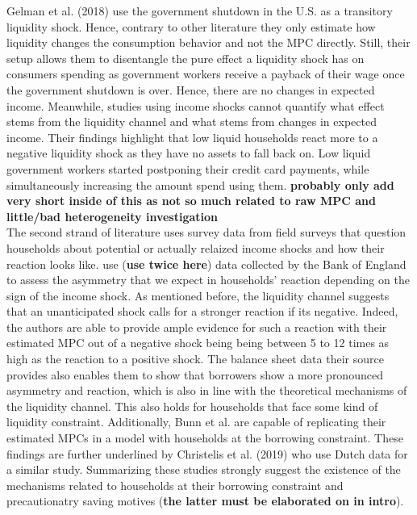 Gelman et al. (2018) use the government shutdown in the U.S. as a transitory liquidity shock. Hence, contrary to other literature they only estimate how liquidity changes the consumption behavior and not the MPC directly. Still, their setup allows them to disentangle the pure effect a liquidity shock has on consumers spending as government workers receive a payback of their wage once the government shutdown is over. Hence, there are no changes in expected income. Meanwhile, studies using income shocks cannot quantify what effect stems from the liquidity channel and what stems from changes in expected income. Their findings highlight that low liquid households react more to a negative liquidity shock as they have no assets to fall back on. Low liquid government workers started postponing their credit card payments, while simultaneously increasing the amount spend using them. \textbf{probably only add very short inside of this as not so much related to raw MPC and little/bad heterogeneity investigation} \\
The second strand of literature uses survey data from field surveys that question households about potential or actually relaized income shocks and how their reaction looks like. \cite{bunn_etal} use (\textbf{use twice here}) data collected by the Bank of England to assess the asymmetry that we expect in households' reaction depending on the sign of the income shock. As mentioned before, the liquidity channel suggests that an unanticipated shock calls for a stronger reaction if its negative. Indeed, the authors are able to provide ample evidence for such a reaction with their estimated MPC out of a negative shock being being between 5 to 12 times as high as the reaction to a positive shock. The balance sheet data their source provides also enables them to show that borrowers show a more pronounced asymmetry and reaction, which is also in line with the theoretical mechanisms of the liquidity channel. This also holds for households that face some kind of liquidity constraint. Additionally, Bunn et al. are capable of replicating their estimated MPCs in a model with households at the borrowing constraint. These findings are further underlined by Christelis et al. (2019) who use Dutch data for a similar study. Summarizing these studies strongly suggest the existence of the mechanisms related to households at their borrowing constraint and precautionatry saving motives (\textbf{the latter must be elaborated on in intro}). 

